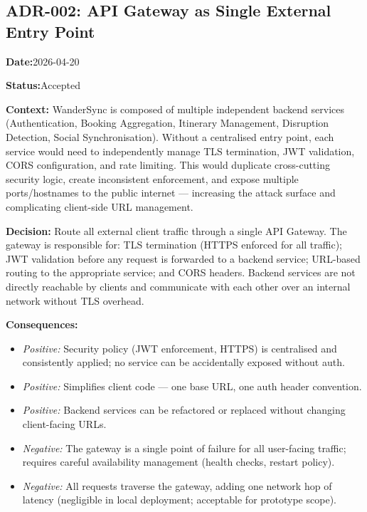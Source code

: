 \documentclass[12pt,a4paper]{article}
\newcommand{\adrfield}[2]{%
  \noindent\textbf{#1:}\hspace{0.5em}#2\par\vspace{0.3em}%
}
\begin{document}
\vspace{1em}

\subsection{ADR-002: API Gateway as Single External Entry Point}

\begin{mdframed}[backgroundcolor=adrbox, linecolor=accent, linewidth=0.8pt]
\adrfield{Date}{2026-04-20}
\adrfield{Status}{Accepted}
\end{mdframed}

\vspace{0.5em}

\adrfield{Context}{
  WanderSync is composed of multiple independent backend services (Authentication, Booking
  Aggregation, Itinerary Management, Disruption Detection, Social Synchronisation). Without a
  centralised entry point, each service would need to independently manage TLS termination, JWT
  validation, CORS configuration, and rate limiting. This would duplicate cross-cutting security
  logic, create inconsistent enforcement, and expose multiple ports/hostnames to the public
  internet — increasing the attack surface and complicating client-side URL management.
}

\adrfield{Decision}{
  Route all external client traffic through a single API Gateway. The gateway is responsible for:
  TLS termination (HTTPS enforced for all traffic); JWT validation before any request is forwarded
  to a backend service; URL-based routing to the appropriate service; and CORS headers. Backend
  services are not directly reachable by clients and communicate with each other over an internal
  network without TLS overhead.
}

\adrfield{Consequences}{
  \begin{itemize}[noitemsep]
    \item \textit{Positive:} Security policy (JWT enforcement, HTTPS) is centralised and
          consistently applied; no service can be accidentally exposed without auth.
    \item \textit{Positive:} Simplifies client code — one base URL, one auth header convention.
    \item \textit{Positive:} Backend services can be refactored or replaced without changing
          client-facing URLs.
    \item \textit{Negative:} The gateway is a single point of failure for all user-facing traffic;
          requires careful availability management (health checks, restart policy).
    \item \textit{Negative:} All requests traverse the gateway, adding one network hop of latency
          (negligible in local deployment; acceptable for prototype scope).
  \end{itemize}
}
\end{document}
